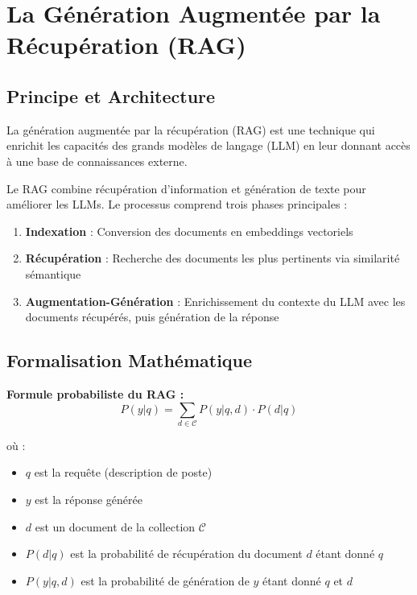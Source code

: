\documentclass{rapportECL}
\begin{document}
\section{La Génération Augmentée par la Récupération (RAG)}

\subsection{Principe et Architecture}

La génération augmentée par la récupération (RAG) est une technique qui enrichit les capacités des grands modèles de langage (LLM) en leur donnant accès à une base de connaissances externe. 

Le RAG combine récupération d'information et génération de texte pour améliorer les LLMs. Le processus comprend trois phases principales :

\begin{enumerate}[leftmargin=*]
    \item \textbf{Indexation} : Conversion des documents en embeddings vectoriels
    \item \textbf{Récupération} : Recherche des documents les plus pertinents via similarité sémantique
    \item \textbf{Augmentation-Génération} : Enrichissement du contexte du LLM avec les documents récupérés, puis génération de la réponse
\end{enumerate}

\subsection{Formalisation Mathématique}

\textbf{Formule probabiliste du RAG :}
\begin{equation}
P(y | q) = \sum_{d \in \mathcal{C}} P(y | q, d) \cdot P(d | q)
\end{equation}

où :
\begin{itemize}
    \item $q$ est la requête (description de poste)
    \item $y$ est la réponse générée
    \item $d$ est un document de la collection $\mathcal{C}$
    \item $P(d | q)$ est la probabilité de récupération du document $d$ étant donné $q$
    \item $P(y | q, d)$ est la probabilité de génération de $y$ étant donné $q$ et $d$
\end{itemize}
\end{document}
